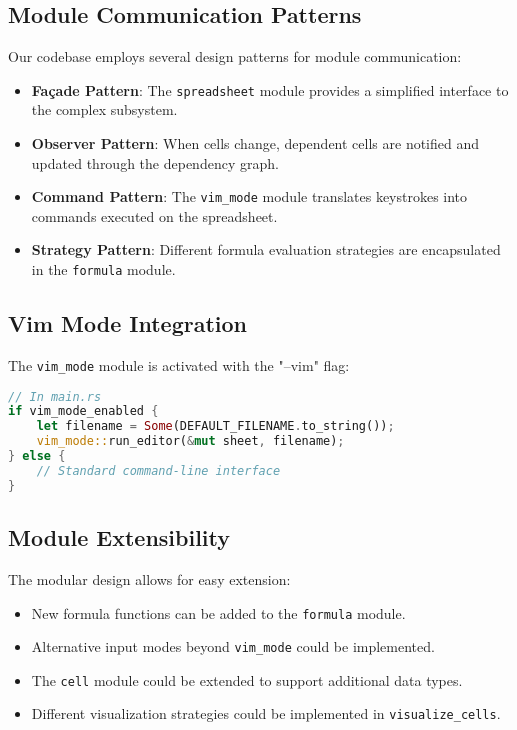 \documentclass[11pt,a4paper]{article}
\begin{document}
\subsection{Module Communication Patterns}

Our codebase employs several design patterns for module communication:

\begin{itemize}
    \item \textbf{Façade Pattern}: The \texttt{spreadsheet} module provides a simplified interface to the complex subsystem.
    \item \textbf{Observer Pattern}: When cells change, dependent cells are notified and updated through the dependency graph.
    \item \textbf{Command Pattern}: The \texttt{vim\_mode} module translates keystrokes into commands executed on the spreadsheet.
    \item \textbf{Strategy Pattern}: Different formula evaluation strategies are encapsulated in the \texttt{formula} module.
\end{itemize}

\subsection{Vim Mode Integration}

The \texttt{vim\_mode} module is activated with the "--vim" flag:

\begin{lstlisting}[language=Rust, caption={Vim mode integration}, label=lst:vim-mode]
// In main.rs
if vim_mode_enabled {
    let filename = Some(DEFAULT_FILENAME.to_string());
    vim_mode::run_editor(&mut sheet, filename);
} else {
    // Standard command-line interface
}
\end{lstlisting}

\subsection{Module Extensibility}

The modular design allows for easy extension:

\begin{itemize}
    \item New formula functions can be added to the \texttt{formula} module.
    \item Alternative input modes beyond \texttt{vim\_mode} could be implemented.
    \item The \texttt{cell} module could be extended to support additional data types.
    \item Different visualization strategies could be implemented in \texttt{visualize\_cells}.
\end{itemize}
\end{document}
